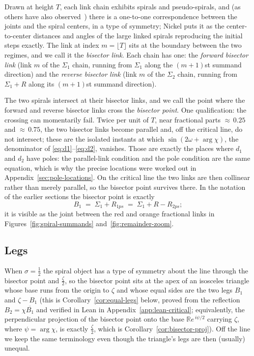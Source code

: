 \documentclass[11pt]{article}
\theoremstyle{definition}
\begin{document}
Drawn at height $T$, each link chain exhibits spirals and pseudo-spirals, and (as
others have also observed~\cite{Erickson2005,Nickel2013,Kapitonets2019}) there is a one-to-one correspondence between the
joints and the spiral centers, in a type of symmetry; Nickel puts it as the
center-to-center distances and angles of the large linked spirals reproducing
the initial steps exactly. The link
at index $m=\lfloor T\rfloor$ sits at the boundary between the two
regimes, and we call it the \emph{bisector link}. Each chain has one: the \emph{forward bisector link} (link $m$ of the
$\Sigma_1$ chain, running from $\Sigma_1$ along the $(m+1)$st summand
direction) and the \emph{reverse bisector link} (link $m$ of the $\Sigma_2$
chain, running from $\Sigma_1+R$ along its $(m+1)$st summand direction).

The two spirals intersect at their bisector links, and we call the point where
the forward and reverse bisector links cross the \emph{bisector point}. One
qualification: the crossing can momentarily fail. Twice per unit of $T$, near
fractional parts ${\approx}\,0.25$ and ${\approx}\,0.75$, the two bisector
links become parallel and, off the critical line, do not intersect; these are
the isolated instants at which $\sin(2\omega+\arg\chi)$, the denominator of
\eqref{eq:d1}--\eqref{eq:d2}, vanishes. Those are exactly the places where
$d_1$ and $d_2$ have poles: the parallel-link condition and the pole
condition are the same equation, which is why the precise locations were
worked out in Appendix~\ref{sec:pole-locations}. On the critical line the two links are then collinear rather than
merely parallel, so the bisector point survives there.
In the notation of the earlier sections the bisector point is exactly
\begin{equation}\label{eq:bisector-point}
B_1 \;=\; \Sigma_1 + R_{1ps} \;=\; \Sigma_1 + R - R_{2ps};
\end{equation}
it is visible as the joint between the red and orange fractional
links in Figures~\ref{fig:spiral-summands} and~\ref{fig:remainder-zoom}.

\subsection{Legs}\label{sec:legs}

When $\sigma=\tfrac12$ the spiral object
has a type of symmetry about the line through the bisector point and
$\tfrac{\zeta}{2}$, so the bisector point sits at the apex of an isosceles
triangle whose base runs from the origin to $\zeta$ and whose equal sides are
the two legs $B_1$ and $\zeta-B_1$ (this is Corollary~\ref{cor:equal-legs}
below, proved from the reflection
$B_2=\chi\overline{B_1}$ and verified in Lean in
Appendix~\ref{app:lean-critical}; equivalently, the perpendicular projection of the
bisector point onto the base $\mathbb{R}e^{\,i\psi/2}$ carrying $\zeta$, where
$\psi=\arg\chi$, is exactly $\tfrac{\zeta}{2}$, which is
Corollary~\ref{cor:bisector-proj}). Off the line we keep the same
terminology even though the triangle's legs are then (usually) unequal.
\end{document}
